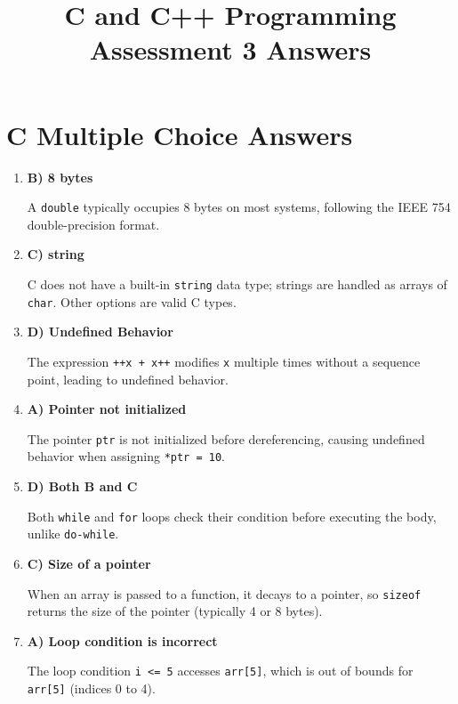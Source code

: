 \documentclass[a4paper,12pt]{article}
\begin{document}
\title{C and C++ Programming Assessment 3 Answers}
\maketitle

\newpage
\pagestyle{empty}

\section{C Multiple Choice Answers}

\begin{enumerate}
    \item \textbf{B) 8 bytes}

    A \verb|double| typically occupies 8 bytes on most systems, following the IEEE 754 double-precision format.

    \item \textbf{C) string}

    C does not have a built-in \verb|string| data type; strings are handled as arrays of \verb|char|. Other options are valid C types.

    \item \textbf{D) Undefined Behavior}

    The expression \verb|++x + x++| modifies \verb|x| multiple times without a sequence point, leading to undefined behavior.

    \item \textbf{A) Pointer not initialized}

    The pointer \verb|ptr| is not initialized before dereferencing, causing undefined behavior when assigning \verb|*ptr = 10|.

    \item \textbf{D) Both B and C}

    Both \verb|while| and \verb|for| loops check their condition before executing the body, unlike \verb|do-while|.

    \item \textbf{C) Size of a pointer}

    When an array is passed to a function, it decays to a pointer, so \verb|sizeof| returns the size of the pointer (typically 4 or 8 bytes).

    \item \textbf{A) Loop condition is incorrect}

    The loop condition \verb|i <= 5| accesses \verb|arr[5]|, which is out of bounds for \verb|arr[5]| (indices 0 to 4).


\end{enumerate}
\end{document}
